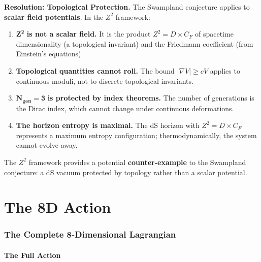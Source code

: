 \documentclass[11pt,a4paper]{article}
\theoremstyle{plain}
\theoremstyle{definition}
\theoremstyle{remark}
\newcommand{\CF}{C_F}
\newcommand{\Ngen}{N_{\text{gen}}}
\begin{document}
\textbf{Resolution: Topological Protection.} The Swampland conjecture applies to \textbf{scalar field potentials}. In the $Z^2$ framework:
\begin{enumerate}
  \item $\mathbf{Z^2}$ \textbf{is not a scalar field.} It is the product $Z^2 = D \times \CF$ of spacetime dimensionality (a topological invariant) and the Friedmann coefficient (from Einstein's equations).
  \item \textbf{Topological quantities cannot roll.} The bound $|\nabla V| \geq cV$ applies to continuous moduli, not to discrete topological invariants.
  \item $\mathbf{\Ngen = 3}$ \textbf{is protected by index theorems.} The number of generations is the Dirac index, which cannot change under continuous deformations.
  \item \textbf{The horizon entropy is maximal.} The dS horizon with $Z^2 = D \times \CF$ represents a maximum entropy configuration; thermodynamically, the system cannot evolve away.
\end{enumerate}

The $Z^2$ framework provides a potential \textbf{counter-example} to the Swampland conjecture: a dS vacuum protected by topology rather than a scalar potential.

\part{The 8D Action}

\section{The Complete 8-Dimensional Lagrangian}

\subsection{The Full Action}

\begin{center}
\end{center}
\end{document}
